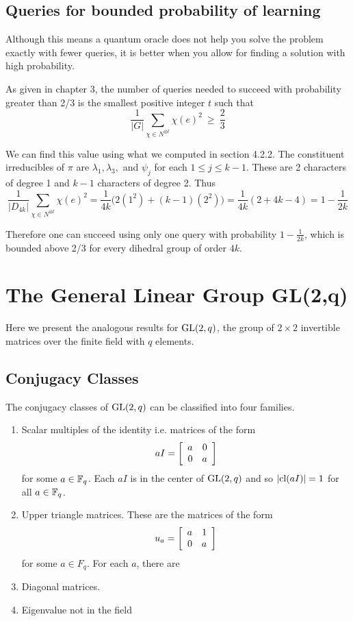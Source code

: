 \subsection{Queries for bounded probability of learning}
Although this means a quantum oracle does not help you solve the problem exactly with fewer queries, it is better 
when you allow for finding a solution with high probability.

As given in chapter 3, the number of queries needed to succeed with probability greater than 2/3 is the smallest 
positive integer $t$ such that
\[
    \frac{1}{|G|} \sum_{\chi \in N^{\otimes t}} \chi(e)^2  \ \geq\  \frac{2}{3}
\]

We can find this value using what we computed in section 4.2.2.  The constituent irreducibles of $\pi$ are 
$\lambda_1, \lambda_3,$ and $\psi_j$ for each $1 \leq j \leq k-1$. These are 2 characters of degree 1 and $k-1$ 
characters of degree 2. Thus
\[
    \frac{1}{|D_{4k}|} \sum_{\chi \in N^{\otimes t}} \chi(e)^2 = \frac{1}{4k}\bigl( 2(1^2) + (k-1)(2^2) \bigr) = 
    \frac{1}{4k}(2 + 4k - 4) = 1 - \frac{1}{2k}
\]

Therefore one can succeed using only one query with probability $1 - \frac{1}{2k}$, which is bounded above 2/3 for 
every dihedral group of order $4k$.

\section{The General Linear Group GL(2,q)}

Here we present the analogous results for $\operatorname{GL}(2, q)$, the group of $2 \times 2$ invertible matrices over the 
finite field with $q$ elements. 



\subsection{Conjugacy Classes}

The conjugacy classes of $\operatorname{GL}(2,q)$ can be classified into four families.
\begin{enumerate}
    \item Scalar multiples of the identity i.e. matrices of the form
        \[
           aI =  \left[\begin{array}{rr}a&0\\0&a\end{array}\right]
        \]
        for some $a \in \mathbb{F}_q$. Each $aI$ is in the center of $\operatorname{GL}(2,q)$ and so $|\text{cl}(aI)| = 1$ for all $a \in 
        \mathbb{F}_q$.

    \item Upper triangle matrices. These are the matrices of the form
    \[
        u_a = \left[\begin{array}{rr}a&1\\0&a\end{array}\right]
    \]
    for some $a \in F_q$. For each $a$, there are 
    \item Diagonal matrices. 


    \item Eigenvalue not in the field
\end{enumerate}


